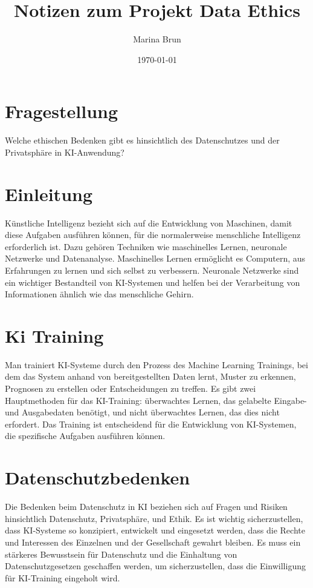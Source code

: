 \documentclass{article}
\title{Notizen zum Projekt Data Ethics}
\author{Marina Brun}
\date{\today}
\begin{document}
\maketitle



\tableofcontents

\section{Fragestellung}
Welche ethischen Bedenken gibt es hinsichtlich des Datenschutzes und der Privatsphäre in KI-Anwendung?

\section{Einleitung}

Künstliche Intelligenz bezieht sich auf die Entwicklung von Maschinen, damit diese Aufgaben ausführen können, für die normalerweise menschliche Intelligenz erforderlich ist. Dazu gehören Techniken wie maschinelles Lernen, neuronale Netzwerke und Datenanalyse. Maschinelles Lernen ermöglicht es Computern, aus Erfahrungen zu lernen und sich selbst zu verbessern. Neuronale Netzwerke sind ein wichtiger Bestandteil von KI-Systemen und helfen bei der Verarbeitung von Informationen ähnlich wie das menschliche Gehirn.

\section{Ki Training}

Man trainiert KI-Systeme durch den Prozess des Machine Learning Trainings, bei dem das System anhand von bereitgestellten Daten lernt, Muster zu erkennen, Prognosen zu erstellen oder Entscheidungen zu treffen. Es gibt zwei Hauptmethoden für das KI-Training: überwachtes Lernen, das gelabelte Eingabe- und Ausgabedaten benötigt, und nicht überwachtes Lernen, das dies nicht erfordert. Das Training ist entscheidend für die Entwicklung von KI-Systemen, die spezifische Aufgaben ausführen können.

\section{Datenschutzbedenken}
 
Die Bedenken beim Datenschutz in KI beziehen sich auf Fragen und Risiken hinsichtlich Datenschutz, Privatsphäre, und Ethik. Es ist wichtig sicherzustellen, dass KI-Systeme so konzipiert, entwickelt und eingesetzt werden, dass die Rechte und Interessen des Einzelnen und der Gesellschaft gewahrt bleiben. Es muss ein stärkeres Bewusstsein für Datenschutz und die Einhaltung von Datenschutzgesetzen geschaffen werden, um sicherzustellen, dass die Einwilligung für KI-Training eingeholt wird.

\printbibliography
\end{document}
